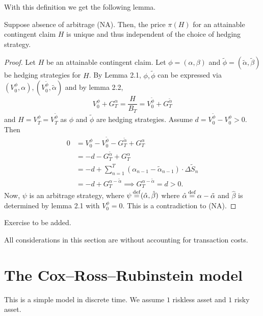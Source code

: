 \documentclass[12pt]{amsart}
\begin{document}
With this definition we get the following lemma.

\begin{lemma}
    Suppose absence of arbitrage (NA). Then, the price \(\pi(H)\) for an attainable contingent claim \(H\) is unique and thus independent of the choice of hedging strategy.
\end{lemma}
\begin{proof}
    Let \(H\) be an attainable contingent claim. Let \(\phi = (\alpha, \beta)\) and \(\tilde{\phi} = (\tilde{\alpha}, \tilde{\beta})\) be hedging strategies for \(H\). By Lemma 2.1, \(\phi, \tilde{\phi}\) can be expressed via \((V_0^\phi, \alpha), (V_0^{\tilde{\phi}}, \tilde{\alpha})\) and by lemma 2.2, \[
        V_0^\phi + G_T^\alpha = \frac{H}{B_T} = V_0^{\tilde{\phi}} + G_T^{\tilde{\alpha}}
    \]
    and \(H = V_T^\phi = V_T^{\tilde{\phi}}\) as \(\phi\) and \(\tilde{\phi}\) are hedging strategies. Assume \(d = V_0^{\tilde{\phi}} - V_0^\phi > 0\). Then
    \begin{align*}
        0
        &= V_0^\phi - V_0^{\tilde{\phi}} - G_T^{\tilde{\alpha}} + G_T^\alpha\\
        &= -d - G_T^{\tilde{\alpha}} + G_T^{\alpha}\\
        &= -d + \sum_{n=1}^T \left( \alpha_{n-1} - \tilde{\alpha}_{n-1} \right) \cdot \Delta \tilde{S}_{n}\\
        &= -d + G_T^{\alpha-\tilde \alpha} \implies G_T^{\alpha - \tilde \alpha} = d > 0.
    \end{align*}
    Now, \(\psi\) is an arbitrage strategy, where \(\psi \operatorname*{\stackrel{\operatorname{def}}{=}} (\hat{\alpha}, \hat{\beta})\) where \(\hat{\alpha} \operatorname*{\stackrel{\operatorname{def}}{=}} \alpha - \tilde{\alpha}\) and \(\hat{\beta}\) is determined by lemma 2.1 with \(V_0^\phi = 0\). This is a contradiction to (NA).
\end{proof}

\color{red}
Exercise to be added.
\color{black}

\begin{remark}
    All considerations in this section are without accounting for transaction costs.
\end{remark}

\section{The Cox--Ross--Rubinstein model}

This is a simple model in discrete time. We assume \(1\) riskless asset and \(1\) risky asset.
\end{document}
